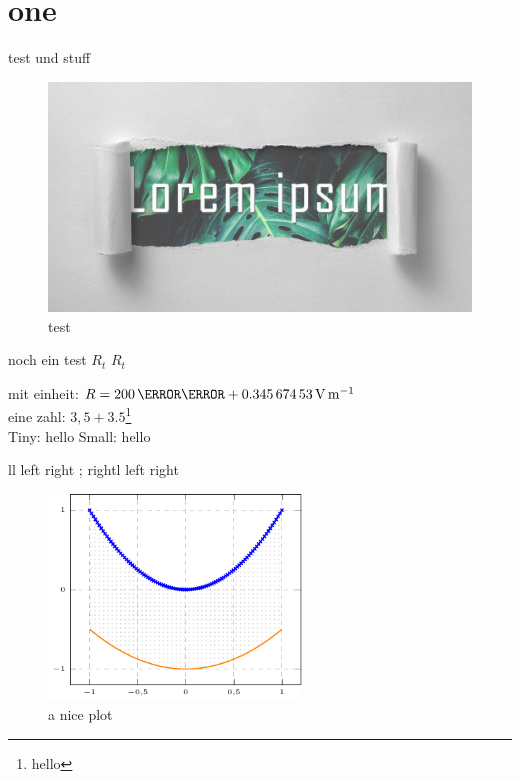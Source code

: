 \documentclass[twoside,f1,ngerman]{HsH-report}
\begin{document}
\maketitle
\declarationAuthorship

\begin{abstract}
	\lipsum[5-8]
\end{abstract}

\tableofcontents

\cleardoublepage %

\chapter{one}
	\label{chap: one}
	{\color{red}test} und stuff
	\begin{figure}
		\centering
		\includegraphics[width=.6\textwidth]{img/lorem-ipsum.jpg}
		\caption{test}
	\end{figure}

	noch ein test \normalsubscripts$R_t$ \upsubscripts$R_t$

	mit einheit: $R=200\,\milli\ohm+ \SI{0.34567453}{\volt\per\metre}$
	\cite{laboranleitung:physik}
	\vspace{2cm}\\
	eine zahl: $3,5+3.5$\footnote[1]{hello}\\

	Tiny: {\tiny hello} Small: {\small hello}

	\makeatletter
	\newcommand{\test}[1][l]{
		{
			\def\t{#1}
			\if\t l left
			\else
				right
			\fi
		}
	}
	\test; \test[right]

	\lipsum[5-6]

	\pagebreak
	\begin{figure}
		\centering
		\includegraphics[width=0.6\textwidth, page=2]{plt/examplePlot.pdf}
		\caption{a nice plot}
	\end{figure}
\end{document}
